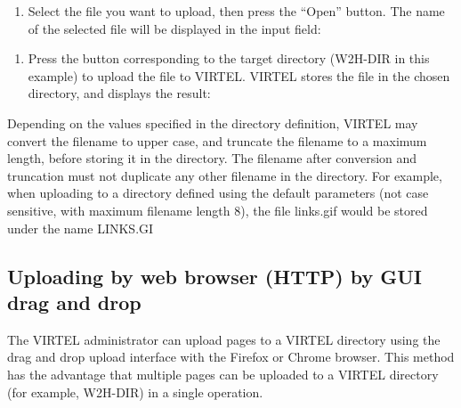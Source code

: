 \documentclass[letterpaper,10pt,english]{sphinxmanual}
\begin{document}
\begin{enumerate}
\def\theenumi{\arabic{enumi}}
\def\labelenumi{\theenumi .}
\makeatletter\def\p@enumii{\p@enumi \theenumi .}\makeatother
\setcounter{enumi}{3}
\item {} 
Select the file you want to upload, then press the “Open” button. The name of the selected file will be displayed in the input field:

\end{enumerate}


\begin{enumerate}
\def\theenumi{\arabic{enumi}}
\def\labelenumi{\theenumi .}
\makeatletter\def\p@enumii{\p@enumi \theenumi .}\makeatother
\setcounter{enumi}{4}
\item {} 
Press the button corresponding to the target directory (W2H-DIR in this example) to upload the file to VIRTEL. VIRTEL stores the file in the chosen directory, and displays the result:

\end{enumerate}



Depending on the values specified in the directory definition, VIRTEL may convert the filename to upper case, and truncate the filename to a maximum length, before storing it in the directory. The filename after conversion and truncation must not duplicate any other filename in the directory. For example, when uploading to a directory defined using the default parameters (not case sensitive, with maximum filename length 8), the file links.gif would be stored under the name LINKS.GI

\newpage

\ignorespaces 

\subsection{Uploading by web browser (HTTP) by GUI drag and drop}
\label{\detokenize{audit_operations_ and_performance:uploading-by-web-browser-http-by-gui-drag-and-drop}}\label{\detokenize{audit_operations_ and_performance:index-59}}
The VIRTEL administrator can upload pages to a VIRTEL directory using the drag and drop upload interface with the Firefox or Chrome browser. This method has the advantage that multiple pages can be uploaded to a VIRTEL directory (for example, W2H-DIR) in a single operation.
\end{document}
